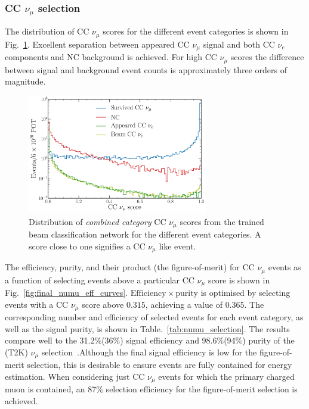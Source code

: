 \subsubsection*{CC $\nu_{\mu}$ selection} %

The distribution of CC $\nu_{\mu}$ scores for the different event categories is shown in
Fig.~\ref{fig:final_beam_numu_outputs}. Excellent separation between appeared CC $\nu_{\mu}$
signal and both CC $\nu_{e}$ components and NC background is achieved. For high CC $\nu_{\mu}$
scores the difference between signal and background event counts is approximately three orders of
magnitude.

\begin{figure} %
    \includegraphics[width=0.7\textwidth]{diagrams/6-cvn/chipsnet/final_beam_numu_outputs.pdf}
    \caption[Distribution of CC $\nu_{\mu}$ scores from the trained beam classification network.]
    {Distribution of \emph{combined category} CC $\nu_{\mu}$ scores from the trained beam
        classification network for the different event categories. A score close to one signifies
        a CC $\nu_{\mu}$ like event.}
    \label{fig:final_beam_numu_outputs}
\end{figure}

The efficiency, purity, and their product (the figure-of-merit) for CC $\nu_{\mu}$ events as a
function of selecting events above a particular CC $\nu_{\mu}$ score is shown in
Fig.~\ref{fig:final_numu_eff_curves}. $\mathrm{Efficiency}\times\mathrm{purity}$ is optimised by
selecting events with a CC $\nu_{\mu}$ score above $0.315$, achieving a value of $0.365$. The
corresponding number and efficiency of selected events for each event category, as well as the
signal purity, is shown in Table.~\ref{tab:numu_selection}. The results compare well to the
31.2\%(36\%) signal efficiency and 98.6\%(94\%) purity of the \nova(T2K) $\nu_{\mu}$
selection~\cite{acero2019, abe2015}.Although the final signal efficiency is low for the
figure-of-merit selection, this is desirable to ensure events are fully contained for energy
estimation. When considering just CC $\nu_{\mu}$ events for which the primary charged muon is
contained, an 87\% selection efficiency for the figure-of-merit selection is achieved.

